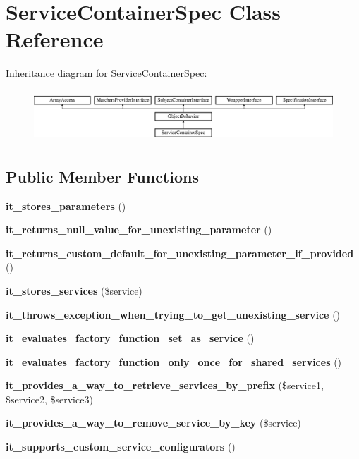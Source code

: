\section{Service\+Container\+Spec Class Reference}
\label{classspec_1_1_php_spec_1_1_service_container_spec}
Inheritance diagram for Service\+Container\+Spec\+:\begin{figure}[H]
\begin{center}
\leavevmode
\includegraphics[height=1.953488cm]{classspec_1_1_php_spec_1_1_service_container_spec}
\end{center}
\end{figure}
\subsection*{Public Member Functions}
\begin{DoxyCompactItemize}
\item 
{\bf it\+\_\+stores\+\_\+parameters} ()
\item 
{\bf it\+\_\+returns\+\_\+null\+\_\+value\+\_\+for\+\_\+unexisting\+\_\+parameter} ()
\item 
{\bf it\+\_\+returns\+\_\+custom\+\_\+default\+\_\+for\+\_\+unexisting\+\_\+parameter\+\_\+if\+\_\+provided} ()
\item 
{\bf it\+\_\+stores\+\_\+services} (\$service)
\item 
{\bf it\+\_\+throws\+\_\+exception\+\_\+when\+\_\+trying\+\_\+to\+\_\+get\+\_\+unexisting\+\_\+service} ()
\item 
{\bf it\+\_\+evaluates\+\_\+factory\+\_\+function\+\_\+set\+\_\+as\+\_\+service} ()
\item 
{\bf it\+\_\+evaluates\+\_\+factory\+\_\+function\+\_\+only\+\_\+once\+\_\+for\+\_\+shared\+\_\+services} ()
\item 
{\bf it\+\_\+provides\+\_\+a\+\_\+way\+\_\+to\+\_\+retrieve\+\_\+services\+\_\+by\+\_\+prefix} (\$service1, \$service2, \$service3)
\item 
{\bf it\+\_\+provides\+\_\+a\+\_\+way\+\_\+to\+\_\+remove\+\_\+service\+\_\+by\+\_\+key} (\$service)
\item 
{\bf it\+\_\+supports\+\_\+custom\+\_\+service\+\_\+configurators} ()
\end{DoxyCompactItemize}
